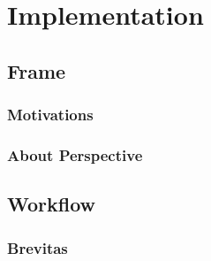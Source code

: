 \chapter{Implementation} %

\label{Chapters} %



\section{Frame}


\subsection{Motivations}


\subsection{About Perspective}


\section{Workflow}


\subsection{Brevitas}



